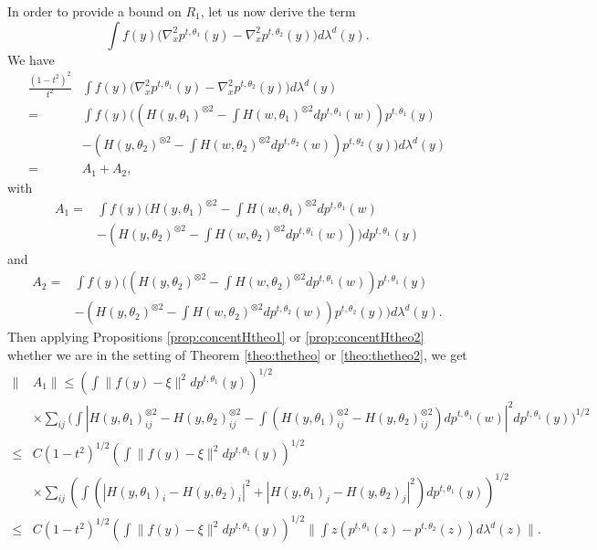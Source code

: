 \documentclass{article}
\begin{document}
In order to provide a bound on
$R_1$, let us now derive the term 
$$\int f(y)\big(\nabla_x^2 p^{t,\theta_1}(y)-\nabla_x^2 p^{t,\theta_2}(y)\big)d\lambda^d(y).$$
We have
\begin{align*}
\frac{(1-t^2)^2}{t^2}&\int f(y)\big(\nabla^2_x p^{t,\theta_1}(y)-\nabla^2_x p^{t,\theta_2}(y)\big)d\lambda^d(y)\\
     = &\int f(y)\Biggl( \left(H(y,\theta_1)^{\otimes 2}- \int H(w,\theta_1)^{\otimes 2} dp^{t,\theta_1}(w)\right)p^{t,\theta_1}(y)\\
    & - \left(H(y,\theta_2)^{\otimes 2}-\int H(w,\theta_2)^{\otimes 2} dp^{t,\theta_2}(w)\right)p^{t,\theta_2}(y)\Biggl)d\lambda^d(y)\\
     = & A_1 +A_2,
\end{align*}
with 
\begin{align*}
    A_1 =&\int f(y)\Biggl( H(y,\theta_1)^{\otimes 2}- \int H(w,\theta_1)^{\otimes 2} dp^{t,\theta_1}(w)\\
    & - \left(H(y,\theta_2)^{\otimes 2}-\int H(w,\theta_2)^{\otimes 2} dp^{t,\theta_1}(w)\right)\Biggl)dp^{t,\theta_1}(y)
\end{align*}
and 
\begin{align*}
    A_2 =& \int f(y)\Biggl(\left(H(y,\theta_2)^{\otimes 2}-\int H(w,\theta_2)^{\otimes 2} dp^{t,\theta_1}(w)\right)p^{t,\theta_1}(y)\\
    &-\left(H(y,\theta_2)^{\otimes 2}-\int H(w,\theta_2)^{\otimes 2} dp^{t,\theta_2}(w)\right)p^{t,\theta_2}(y)\Biggl)d\lambda^d(y).
\end{align*}
Then applying Propositions \ref{prop:concentHtheo1} or \ref{prop:concentHtheo2} whether we are in the setting of Theorem \ref{theo:thetheo} or \ref{theo:thetheo2}, we get 
\begin{align}\label{eq:premiertermlipgrand}
    \|&A_1\| \leq  \left(\int \|f(y)-\xi\|^2dp^{t,\theta_1}(y)\right)^{1/2}\nonumber\\
    & \times\sum_{ij} \Biggl(\int |H(y,\theta_1)_{ij}^{\otimes2}-H(y,\theta_2)_{ij}^{\otimes2} -\int (H(y,\theta_1)_{ij}^{\otimes2}-H(y,\theta_2)_{ij}^{\otimes2})dp^{t,\theta_1}(w)|^2dp^{t,\theta_1}(y)\Biggl)^{1/2}\nonumber\\
    \leq & C(1-t^2)^{1/2}\left(\int \|f(y)-\xi\|^2dp^{t,\theta_1}(y)\right)^{1/2}\nonumber\\
    & \times \sum_{ij}\left(\int (|H(y,\theta_1)_i-H(y,\theta_2)_i|^2+|H(y,\theta_1)_j-H(y,\theta_2)_j|^2)dp^{t,\theta_1}(y)\right)^{1/2}\nonumber\\
    \leq & C(1-t^2)^{1/2}\left(\int \|f(y)-\xi\|^2dp^{t,\theta_1}(y)\right)^{1/2} \|\int z(p^{t,\theta_1}(z)-p^{t,\theta_2}(z))d\lambda^d(z)\|.
\end{align}
\end{document}
